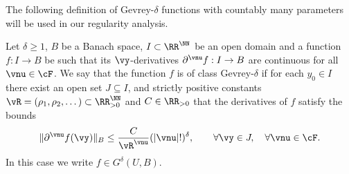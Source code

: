  The following definition of Gevrey-$\delta$ functions with countably many parameters will be used in our regularity analysis.
\begin{definition} \label{def:G-delta-def}
	Let $\delta \geq 1$, $B$ be a Banach space, $I \subset \RR^\NN$ be an open domain and a function $f:I \to B$ be such that its $\vy$-derivatives $\partial^{\vnu} f:I \to B$ are continuous for all $\vnu \in \cF$. We say that the function $f$ is of class Gevrey-$\delta$ if for each $y_0 \in I$ there exist an open set $J\subseteq I$, and strictly positive constants $\vR = (\rho_1,\rho_2,\dots) \subset \RR_{>0}^{\NN}$ and $C \in \RR_{>0}$ that the derivatives of $f$ satisfy the bounds
	\begin{equation}\label{G-delta-def}
		\|\partial^{\vnu} f(\vy)\|_B \leq \frac{C}{\vR^{\vnu}} (|\vnu|!)^\delta, \qquad \forall \vy \in J, \quad \forall \vnu \in \cF.
	\end{equation}
	In this case we write $f \in G^\delta(U,B)$.
\end{definition}


